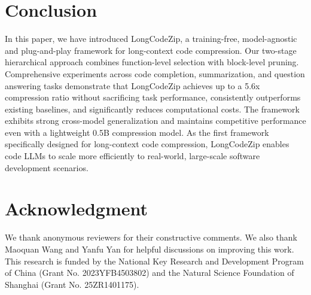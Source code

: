 \documentclass[10pt,conference]{IEEEtran}
\newcommand{\approach}{{LongCodeZip}\xspace} %
\begin{document}
\section{Conclusion}

In this paper, we have introduced \approach, a training-free, model-agnostic and plug-and-play framework for long-context code compression. Our two-stage hierarchical approach combines function-level selection with block-level pruning.
Comprehensive experiments across code completion, summarization, and question answering tasks demonstrate that \approach achieves up to a 5.6x compression ratio without sacrificing task performance, consistently outperforms existing baselines, and significantly reduces computational costs. The framework exhibits strong cross-model generalization and maintains competitive performance even with a lightweight 0.5B compression model. As the first framework specifically designed for long-context code compression, \approach enables code LLMs to scale more efficiently to real-world, large-scale software development scenarios.


\section*{Acknowledgment}
We thank anonymous reviewers for their constructive comments. We also thank Maoquan Wang and Yanfu Yan for helpful discussions on improving this work.
This research is funded by the National Key Research and Development Program of China (Grant No. 2023YFB4503802) and the Natural Science Foundation of Shanghai (Grant No. 25ZR1401175).
\end{document}
